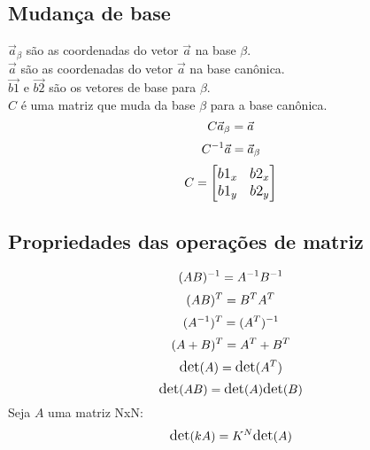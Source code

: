 \subsection{Mudança de base}
\large {$\vec{a}_\beta$ são as coordenadas do vetor $\vec{a}$ na base $\beta$.\\}
\large {$\vec{a}$ são as coordenadas do vetor $\vec{a}$ na base canônica.\\}
\large {$\vec{b1}$ e $\vec{b2}$ são os vetores de base para $\beta$.\\}
\large {$C$ é uma matriz que muda da base $\beta$ para a base canônica.}
\begin{equation*}
\large{C \vec{a}_\beta = \vec{a}}
\end{equation*} 
\begin{equation*}
\large{C^{-1} \vec{a} = \vec{a}_\beta}
\end{equation*} 
\begin{equation*} 
\large{
C = 
\begin{bmatrix}
    b1_x & b2_x \\
    b1_y & b2_y
\end{bmatrix}
}
\end{equation*}

\subsection{Propriedades das operações de matriz}
\begin{equation*} 
\large{(AB)^{-1} = A^{-1}B^{-1}}\\
\end{equation*}
\begin{equation*} 
\large{(AB)^{T} = B^{T}A^{T}}\\
\end{equation*}
\begin{equation*} 
\large{(A^{-1})^{T} = (A^{T})^{-1}}\\
\end{equation*}
\begin{equation*} 
\large{(A+B)^{T} = A^{T} + B^{T}}\\
\end{equation*}
\begin{equation*} 
\large{\text{det}(A) = \text{det}(A^{T})}\\
\end{equation*}
\begin{equation*} 
\large{\text{det}(AB) = \text{det}(A)\text{det}(B)}\\
\end{equation*}
\large{Seja $A$ uma matriz NxN:}
\begin{equation*} 
\large{\text{det}(kA) = K^N\text{det}(A)}\\
\end{equation*}